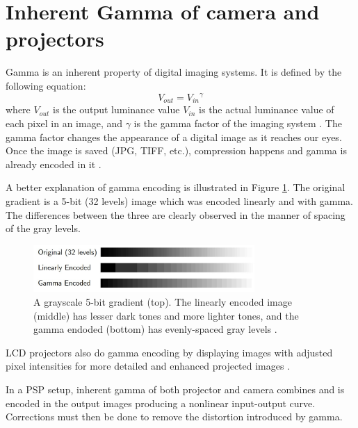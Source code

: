\section{Inherent Gamma of camera and projectors}

Gamma is an inherent property of digital imaging systems. It is defined by the following equation:
\begin{equation}
V_{out} = {V_{in}}^\gamma
\end{equation}
where $V_{out}$ is the output luminance value $V_{in}$ is the actual luminance value of each pixel in an image, and $\gamma$ is the gamma factor of the imaging system \cite{cambridge}. The gamma factor changes the appearance of a digital image as it reaches our eyes. Once the image is saved (JPG, TIFF, etc.), compression happens and gamma is already encoded in it \cite{}.

A better explanation of gamma encoding is illustrated in Figure \ref{fig:gammafactor}. The original gradient is a 5-bit (32 levels) image which was encoded linearly and with gamma. The differences between the three are clearly observed in the manner of spacing of the gray levels. 

\captionsetup[figure]{width=5in}
\begin{figure}[h!]
	\centering
	\includegraphics[width=0.75\textwidth]{figures/gammafactor.jpg}
	\caption{A grayscale 5-bit gradient (top). The linearly encoded image (middle) has lesser dark tones and more lighter tones, and the gamma endoded (bottom) has evenly-spaced gray levels \cite{cambridge}.}
	\label{fig:gammafactor}
\end{figure}

LCD projectors also do gamma encoding by displaying images with adjusted pixel intensities for more detailed and enhanced projected images \cite{gamma_correction}. 

In a PSP setup, inherent gamma of both projector and camera combines and is encoded in the output images producing a nonlinear input-output curve. Corrections must then be done to remove the distortion introduced by gamma.

